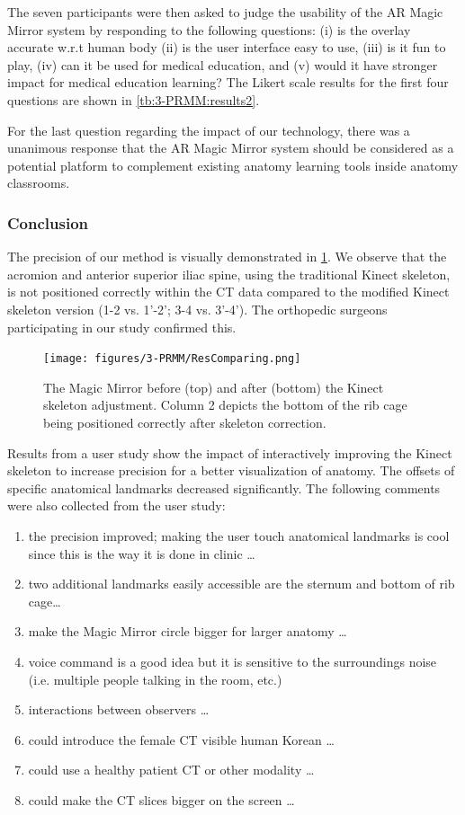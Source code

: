 The seven participants were then asked to judge the usability of the AR Magic Mirror system by responding to the following questions: (i) is the overlay accurate w.r.t human body (ii) is the user interface easy to use, (iii) is it fun to play, (iv) can it be used for medical education, and (v) would it have stronger impact for medical education learning?
The Likert scale results for the first four questions are shown in \tablename{\ref{tb:3-PRMM:results2}}.


For the last question regarding the impact of our technology, there was a unanimous response that the AR Magic Mirror system should be considered as a potential platform to complement existing anatomy learning tools inside anatomy classrooms. 

\subsubsection{Conclusion}
The precision of our method is visually demonstrated in \figurename{\ref{fig:3-PRMM:ResComparing}}. We observe that the acromion and anterior superior iliac spine, using the traditional Kinect skeleton, is not positioned correctly within the CT data compared to the modified Kinect skeleton version (1-2 vs. 1'-2'; 3-4 vs. 3'-4'). The orthopedic surgeons participating in our study confirmed this.
\begin{figure}[htb]
	\centering
	\texttt{[image: figures/3-PRMM/ResComparing.png]}
	\caption{The Magic Mirror before (top) and after (bottom) the Kinect skeleton adjustment. Column 2 depicts the bottom of the rib cage being positioned correctly after skeleton correction.}
	\label{fig:3-PRMM:ResComparing}
\end{figure}
Results from a user study show the impact of interactively improving the Kinect skeleton to increase precision for a better visualization of anatomy. The offsets of specific anatomical landmarks decreased significantly. The following comments were also collected from the user study:
\begin{enumerate}
	\item the precision improved; making the user touch anatomical landmarks is cool since this is the way it is done in clinic …
	\item two additional landmarks easily accessible are the sternum and bottom of rib cage…
	\item make the Magic Mirror circle bigger for larger anatomy …
	\item voice command is a good idea but it is sensitive to the surroundings noise (i.e. multiple people talking in the room, etc.)
	\item interactions between observers …
	\item could introduce the female CT visible human Korean …
	\item could use a healthy patient CT or other modality …
	\item could make the CT slices bigger on the screen …
\end{enumerate}

